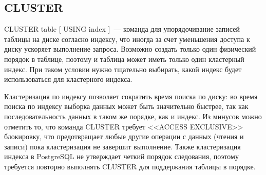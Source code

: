 \subsection{CLUSTER}
CLUSTER table [ USING index ]~--- команда для упорядочивание записей таблицы на диске согласно индексу, что иногда за счет уменьшения доступа к диску ускоряет выполнение запроса. Возможно создать только один физический порядок в таблице, поэтому и таблица может иметь только один кластерный индекс. При таком условии нужно тщательно выбирать, какой индекс будет использоваться для кластерного индекса. 

Кластеризация по индексу позволяет сократить время поиска по диску: во время поиска по индексу выборка данных может быть значительно быстрее, так как последовательность данных в таком же порядке, как и индекс. Из минусов можно отметить то, что команда CLUSTER требует <<ACCESS EXCLUSIVE>> блокировку, что предотвращает любые другие операции с данных (чтения и записи) пока кластеризация не завершит выполнение. Также кластеризация индекса в PostgreSQL не утверждает четкий порядок следования, поэтому требуется повторно выполнять CLUSTER для поддержания таблицы в порядке.